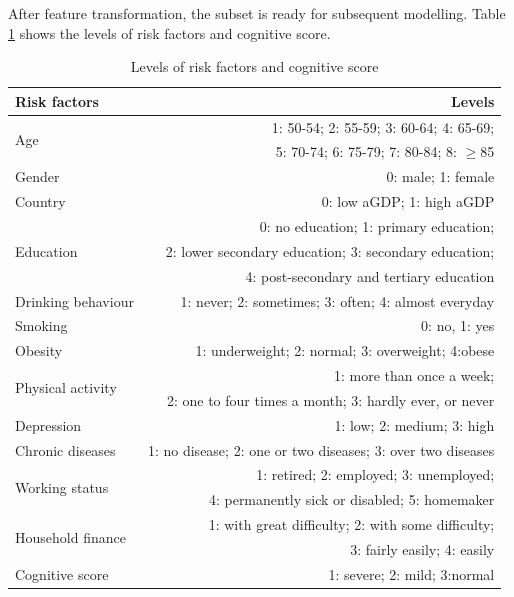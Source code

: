 \documentclass[11pt,twoside]{article}
\numberwithin{Theorem}{section}
\numberwithin{Definition}{section}
\numberwithin{Lemma}{section}
\numberwithin{Algorithm}{section}
\numberwithin{equation}{section}
\begin{document}
After feature transformation, the subset is ready for subsequent modelling. Table \ref{tab:risk_score} shows the levels of risk factors and cognitive score.

\begin{table}[!h]
	\centering
	\begin{tabular}{|l|r|}
		\hline
		Risk factors & Levels \\
		\hline
		\multirow{2}{*}{Age} & 1: 50-54; 2: 55-59; 3: 60-64; 4: 65-69; \\
		 & 5: 70-74; 6: 75-79; 7: 80-84; 8: $\geq$85 \\
		 \hline
		Gender & 0: male; 1: female \\
		\hline
		Country & 0: low aGDP; 1: high aGDP \\
		\hline
		\multirow{3}{*}{Education} & 0: no education; 1: primary education; \\
		 & 2: lower secondary education; 3: secondary education; \\
		 & 4: post-secondary and tertiary education \\
		\hline
		Drinking behaviour & 1: never; 2: sometimes; 3: often; 4: almost everyday \\
		\hline
		Smoking & 0: no, 1: yes \\ 
		\hline
		Obesity & 1: underweight; 2: normal; 3: overweight; 4:obese \\
		\hline
		\multirow{2}{*}{Physical activity} & 1: more than once a week; \\
		 & 2: one to four times a month; 3: hardly ever, or never \\
		\hline
		Depression & 1: low; 2: medium; 3: high \\
		\hline
		Chronic diseases & 1: no disease; 2: one or two diseases; 3: over two diseases \\
		\hline
		\multirow{2}{*}{Working status} & 1: retired; 2: employed; 3: unemployed; \\
		 & 4: permanently sick or disabled; 5: homemaker \\
		\hline
		\multirow{2}{*}{Household finance} & 1: with great difficulty; 2: with some difficulty; \\
		 & 3: fairly easily; 4: easily \\
		 \hline
		Cognitive score & 1: severe; 2: mild; 3:normal \\
		\hline
	\end{tabular}
	\caption{Levels of risk factors and cognitive score}
	\label{tab:risk_score}
\end{table}
\end{document}
